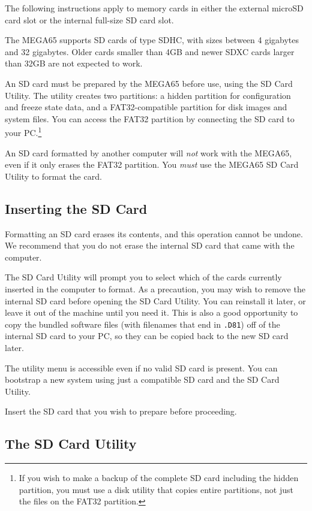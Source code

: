 The following instructions apply to memory cards in either the external microSD card slot or the internal full-size SD card slot.

The MEGA65 supports SD cards of type SDHC, with sizes between 4 gigabytes and 32 gigabytes. Older cards smaller than 4GB and newer SDXC cards larger than 32GB are not expected to work.

An SD card must be prepared by the MEGA65 before use, using the SD Card Utility. The utility creates two partitions: a hidden partition for configuration and freeze state data, and a FAT32-compatible partition for disk images and system files. You can access the FAT32 partition by connecting the SD card to your PC.\footnote{If you wish to make a backup of the complete SD card including the hidden partition, you must use a disk utility that copies entire partitions, not just the files on the FAT32 partition.}

An SD card formatted by another computer will {\em not} work with the MEGA65, even if it only erases the FAT32 partition. You {\em must} use the MEGA65 SD Card Utility to format the card.

\subsection{Inserting the SD Card}

Formatting an SD card erases its contents, and this operation cannot be undone. We recommend that you do not erase the internal SD card that came with the computer.

The SD Card Utility will prompt you to select which of the cards currently inserted in the computer to format. As a precaution, you may wish to remove the internal SD card before opening the SD Card Utility. You can reinstall it later, or leave it out of the machine until you need it. This is also a good opportunity to copy the bundled software files (with filenames that end in {\tt .D81}) off of the internal SD card to your PC, so they can be copied back to the new SD card later.

The utility menu is accessible even if no valid SD card is present. You can bootstrap a new system using just a compatible SD card and the SD Card Utility.

Insert the SD card that you wish to prepare before proceeding.

\subsection{The SD Card Utility}

